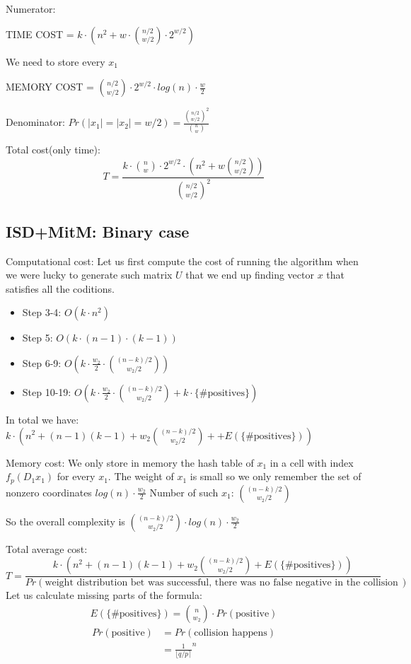 \documentclass[12pt]{article}
\begin{document}
Numerator:

TIME COST = $k \cdot (n^2 + w \cdot \binom{n/2}{w/2} \cdot 2^{w/2})$

We need to store every $x_1$

MEMORY COST = $\binom{n/2}{w/2} \cdot 2^{w/2} \cdot log(n) \cdot \frac{w}{2}$

Denominator:
$Pr(|x_1| = |x_2| = w/2) = \frac{\binom{n/2}{w/2}^{2}}{\binom{n}{w}}$

Total cost(only time):
\[
  T = \frac{k \cdot \binom{n}{w} \cdot 2^{w/2} \cdot (n^2 + w\binom{n/2}{w/2})}{\binom{n/2}{w/2}^2}
\]

\subsection{ISD+MitM: Binary case}


Computational cost:
Let us first compute the cost of running the algorithm when we were lucky to generate such matrix $U$ that we end up finding vector $x$ that satisfies all the coditions.
\begin{itemize}
    \item Step 3-4: $O(k \cdot n^2)$
    \item Step 5: $O(k \cdot (n-1) \cdot (k-1))$
    \item Step 6-9: $O(k \cdot \frac{w_2}{2} \cdot \binom{(n-k)/2}{w_2/2})$
    \item Step 10-19: $O(k \cdot \frac{w_2}{2} \cdot \binom{(n-k)/2}{w_2/2} + k \cdot \{\text{\# positives}\})$
\end{itemize}
In total we have: $k \cdot (n^2 + (n-1)(k-1) + w_2\binom{(n-k)/2}{w_2/2} + + E(\{\text{\# positives}\}))$

Memory cost:
We only store in memory the hash table of $x_1$ in a cell with index $f_{p}(D_1x_1)$ for every $x_1$.
The weight of $x_1$ is small so we only remember the set of nonzero coordinates $log(n) \cdot \frac{w_2}{2}$ Number of such $x_1$: $\binom{(n-k)/2}{w_2/2}$

So the overall complexity is  $\binom{(n-k)/2}{w_2/2} \cdot log(n) \cdot \frac{w_2}{2}$

Total average cost:
\[
    T = \frac{k \cdot (n^2 + (n-1)(k-1) + w_2\binom{(n-k)/2}{w_2/2} + E(\{\text{\# positives}\}))}{Pr(\text{weight distribution bet was successful, there was no false negative in the collision search})}
\]
Let us calculate missing parts of the formula:
\[
\begin{split}
    E(\{\text{\#positives}\}) = \binom{n}{w_2} \cdot Pr(\text{positive})
\end{split}
\]
\[
\begin{split}
    Pr(\text{positive}) & = Pr(\text{collision happens}) \\
    & = \frac{1}{\lfloor q/p \rceil}^{n}
\end{split}
\]
\end{document}
